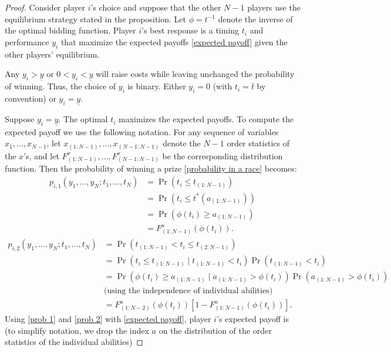 \documentclass[12pt,]{article}
\newcommand\deadline{\bar{t}}
\newcommand\target{\underline{y}}
\begin{document}
\begin{shaded}
\begin{proof}
Consider player $i$'s choice and suppose that the other $N-1$ players use the equilibrium strategy stated in the proposition. Let $\phi=t^{-1}$ denote the inverse of the optimal bidding function. Player $i$'s best response is a timing $t_i$ and performance $y_i$ that maximize the expected payoffs \eqref{expected payoff} given the other players' equilibrium. 

Any $y_i > \target$ or $0<y_i<\target$ will raise costs while leaving unchanged the probability of winning. Thus, the choice of $y_i$ is binary. Either $y_i=0$ (with $t_i=\deadline$ by convention) or $y_i= \target$.

Suppose $y_i=\target$. The optimal $t_i$ maximizes the expected payoffs. To compute the expected payoff we use the following notation. For any sequence of variables $x_1, ..., x_{N-1}$,  let $x_{(1:N-1)}, ..., x_{(N-1:N-1)}$ denote the $N-1$ order statistics of the $x$'s, and let $F^x_{(1:N-1)}, ..., F^x_{(N-1:N-1)}$ be the corresponding distribution function. Then the probability of winning a prize \eqref{probability in a race} becomes:
\begin{align} \label{prob 1}
  p_{i, 1}(y_1,..., y_N; t_1,..., t_N)
    & = \Pr(t_i \leq t_{(1:N-1)}) \nonumber\\
    & = \Pr(t_i \leq t^*(a_{(1:N-1)})) \nonumber\\
    & = \Pr(\phi(t_i) \geq a_{(1:N-1)}) \nonumber\\
    & = F^a_{(1:N-1)}(\phi(t_i)).
\end{align}
\begin{align} \label{prob 2}
  p_{i, 2}(y_1,..., y_N; t_1,..., t_N) 
    & = \Pr(t_{(1:N-1)} < t_i \leq t_{(2:N-1)})  \nonumber\\
    & = \Pr(t_i\leq t_{(1:N-1)}\mid t_{(1:N-1)}<t_i) \Pr(t_{(1:N-1)} < t_i) \nonumber\\
    & = \Pr(\phi(t_i)\geq a_{(1:N-1)} \mid a_{(1:N-1)} > \phi(t_i)) \Pr(a_{(1:N-1)} > \phi(t_i)) \nonumber\\
    & \text{(using the independence of individual abilities)}\nonumber\\
    & = F^a_{(1:N-2)}(\phi(t_i))\left[1 - F^a_{(1:N-1)}(\phi(t_i))\right].
\end{align}
Using \eqref{prob 1} and \eqref{prob 2} with \eqref{expected payoff}, player $i$'s expected payoff is (to simplify notation, we drop the index $a$ on the distribution of the order statistics of the individual abilities)

\end{proof}
\end{shaded}
\end{document}
